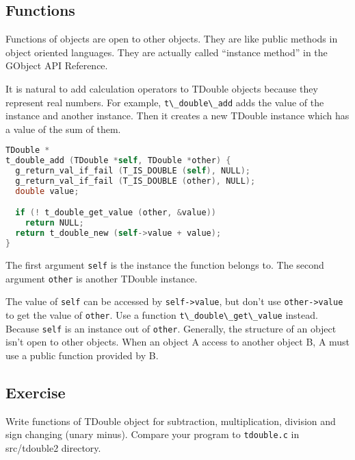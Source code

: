 \subsection{Functions}\label{functions}

Functions of objects are open to other objects. They are like public
methods in object oriented languages. They are actually called
``instance method'' in the GObject API Reference.

It is natural to add calculation operators to TDouble objects because
they represent real numbers. For example,
\passthrough{\lstinline!t\_double\_add!} adds the value of the instance
and another instance. Then it creates a new TDouble instance which has a
value of the sum of them.

\begin{lstlisting}[language=C]
TDouble *
t_double_add (TDouble *self, TDouble *other) {
  g_return_val_if_fail (T_IS_DOUBLE (self), NULL);
  g_return_val_if_fail (T_IS_DOUBLE (other), NULL);
  double value;

  if (! t_double_get_value (other, &value))
    return NULL;
  return t_double_new (self->value + value);
}
\end{lstlisting}

The first argument \passthrough{\lstinline!self!} is the instance the
function belongs to. The second argument \passthrough{\lstinline!other!}
is another TDouble instance.

The value of \passthrough{\lstinline!self!} can be accessed by
\passthrough{\lstinline!self->value!}, but don't use
\passthrough{\lstinline!other->value!} to get the value of
\passthrough{\lstinline!other!}. Use a function
\passthrough{\lstinline!t\_double\_get\_value!} instead. Because
\passthrough{\lstinline!self!} is an instance out of
\passthrough{\lstinline!other!}. Generally, the structure of an object
isn't open to other objects. When an object A access to another object
B, A must use a public function provided by B.

\subsection{Exercise}\label{exercise}

Write functions of TDouble object for subtraction, multiplication,
division and sign changing (unary minus). Compare your program to
\passthrough{\lstinline!tdouble.c!} in src/tdouble2 directory.
